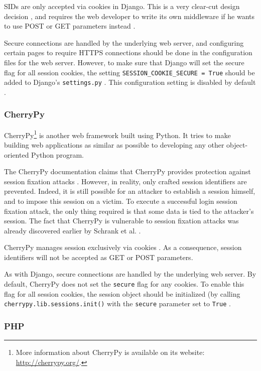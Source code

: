 SIDs are only accepted via cookies in Django. This is a very clear-cut design decision \cite{DjangoSessions}, and requires the web developer to write its own middleware if he wants to use POST or GET parameters instead \cite{Fairs2007}.

Secure connections are handled by the underlying web server, and configuring certain pages to require HTTPS connections should be done in the configuration files for the web server. However, to make sure that Django will set the secure flag for all session cookies, the setting \texttt{SESSION\_COOKIE\_SECURE = True} should be added to Django's \texttt{settings.py} \cite{Barnham2009}. This configuration setting is disabled by default \cite{Holovaty2008}.

\subsubsection{CherryPy}

CherryPy\footnote{More information about CherryPy is available on its website: \url{http://cherrypy.org/}.} is another web framework built using Python. It tries to make building web applications as similar as possible to developing any other object-oriented Python program.

The CherryPy documentation claims that CherryPy provides protection against session fixation attacks \cite{CherryPySessions}. However, in reality, only crafted session identifiers are prevented. Indeed, it is still possible for an attacker to establish a session himself, and to impose this session on a victim. To execute a successful login session fixation attack, the only thing required is that some data is tied to the attacker's session. The fact that CherryPy is vulnerable to session fixation attacks was already discovered earlier by Schrank et al. \cite{Schrank2010}.

CherryPy manages session exclusively via cookies \cite{CherryPySessions}. As a consequence, session identifiers will not be accepted as GET or POST parameters.

As with Django, secure connections are handled by the underlying web server. By default, CherryPy does not set the \texttt{secure} flag for any cookies. To enable this flag for all session cookies, the session object should be initialized (by calling \texttt{cherrypy.lib.sessions.init()} with the \texttt{secure} parameter set to \texttt{True} \cite{CherryPySessions}.

\subsubsection{PHP}


